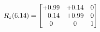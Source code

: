 \documentclass[preview]{standalone}
\begin{document}
\begin{align*}
\special{dvisvgm:raw <g id='unique000'>}R_{z}(6.14) = \begin{bmatrix}+0.99 & +0.14 & 0 \\-0.14 & +0.99 & 0 \\0 & 0 & 1\end{bmatrix}\special{dvisvgm:raw </g>}
\end{align*}
\end{document}
